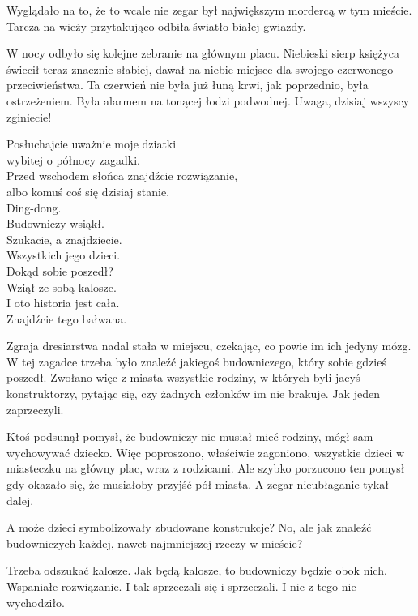 Wyglądało na to, że to wcale nie zegar był największym mordercą w tym mieście.
Tarcza na wieży przytakująco odbiła światło białej gwiazdy.

W nocy odbyło się kolejne zebranie na głównym placu.
Niebieski sierp księżyca świecił teraz znacznie słabiej, dawał na niebie miejsce dla swojego czerwonego przeciwieństwa.
Ta czerwień nie była już łuną krwi, jak poprzednio, była ostrzeżeniem.
Była alarmem na tonącej łodzi podwodnej.
Uwaga, dzisiaj wszyscy zginiecie!

\begin{poem}
	Posłuchajcie uważnie moje dziatki \\
	wybitej o północy zagadki. \\
	Przed wschodem słońca znajdźcie rozwiązanie, \\
	albo komuś coś się dzisiaj stanie. \\
	Ding-dong. \\
	Budowniczy wsiąkł. \\
	Szukacie, a znajdziecie. \\
	Wszystkich jego dzieci. \\
	Dokąd sobie poszedł? \\
	Wziął ze sobą kalosze. \\
	I oto historia jest cała. \\
	Znajdźcie tego bałwana. \\
\end{poem}

Zgraja dresiarstwa nadal stała w miejscu, czekając, co powie im ich jedyny mózg.
W tej zagadce trzeba było znaleźć jakiegoś budowniczego, który sobie gdzieś poszedł.
Zwołano więc z miasta wszystkie rodziny, w których byli jacyś konstruktorzy, pytając się, czy żadnych członków im nie brakuje.
Jak jeden zaprzeczyli.

Ktoś podsunął pomysł, że budowniczy nie musiał mieć rodziny, mógł sam wychowywać dziecko.
Więc poproszono, właściwie zagoniono, wszystkie dzieci w miasteczku na główny plac, wraz z rodzicami.
Ale szybko porzucono ten pomysł gdy okazało się, że musiałoby przyjść pół miasta.
A zegar nieubłaganie tykał dalej.

A może dzieci symbolizowały zbudowane konstrukcje? 
No, ale jak znaleźć budowniczych każdej, nawet najmniejszej rzeczy w mieście?

Trzeba odszukać kalosze. Jak będą kalosze, to budowniczy będzie obok nich. Wspaniałe rozwiązanie.
I tak sprzeczali się i sprzeczali.
I nic z tego nie wychodziło.

